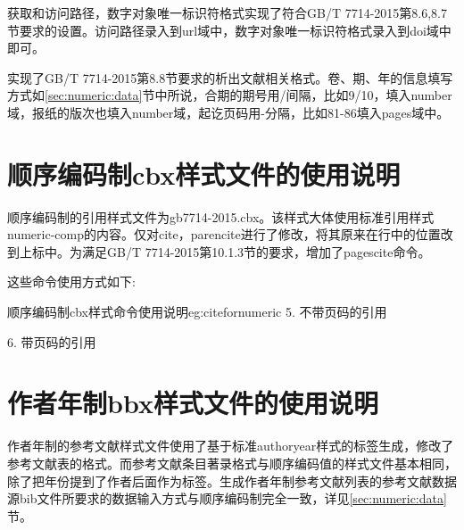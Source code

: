 \documentclass[11pt]{article} %
\begin{document}
\begin{property}{}{}
获取和访问路径，数字对象唯一标识符格式实现了符合GB/T 7714-2015第8.6,8.7节要求的设置。访问路径录入到url域中，数字对象唯一标识符格式录入到doi域中即可。
\end{property}

\begin{property}{}{}
实现了GB/T 7714-2015第8.8节要求的析出文献相关格式。卷、期、年的信息填写方式如\ref{sec:numeric:data}节中所说，合期的期号用/间隔，比如9/10，填入number域，报纸的版次也填入number域，起讫页码用-分隔，比如81-86填入pages域中。
\end{property}

\section{顺序编码制cbx样式文件的使用说明}

顺序编码制的引用样式文件为gb7714-2015.cbx。该样式大体使用标准引用样式numeric-comp的内容。仅对cite，parencite进行了修改，将其原来在行中的位置改到上标中。为满足GB/T 7714-2015第10.1.3节的要求，增加了pagescite命令。

这些命令使用方式如下:

\begin{codetex}{顺序编码制cbx样式命令使用说明}{eg:citefornumeric}
5. 不带页码的引用\cite{Peebles2001-100-100}\parencite{Miroslav2004--}

6. 带页码的引用\cite[见][49页]{蔡敏2006--}\parencite[见][49页]{Miroslav2004--}
\end{codetex}

\section{作者年制bbx样式文件的使用说明}

作者年制的参考文献样式文件使用了基于标准authoryear样式的标签生成，修改了参考文献表的格式。而参考文献条目著录格式与顺序编码值的样式文件基本相同，除了把年份提到了作者后面作为标签。生成作者年制参考文献列表的参考文献数据源bib文件所要求的数据输入方式与顺序编码制完全一致，详见\ref{sec:numeric:data}节。

\end{document}
